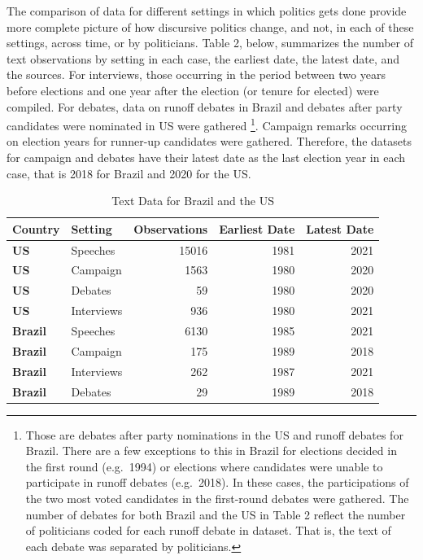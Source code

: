 \documentclass[smallextended]{svjour3}       %
\begin{document}
The comparison of data for different settings in which politics gets
done provide more complete picture of how discursive politics change,
and not, in each of these settings, across time, or by politicians.
Table 2, below, summarizes the number of text observations by setting in
each case, the earliest date, the latest date, and the sources. For
interviews, those occurring in the period between two years before
elections and one year after the election (or tenure for elected) were
compiled. For debates, data on runoff debates in Brazil and debates
after party candidates were nominated in US were gathered \footnote{
  Those are debates after party nominations in the US and runoff debates
  for Brazil. There are a few exceptions to this in Brazil for elections
  decided in the first round (e.g.~1994) or elections where candidates
  were unable to participate in runoff debates (e.g.~2018). In these
  cases, the participations of the two most voted candidates in the
  first-round debates were gathered. The number of debates for both
  Brazil and the US in Table 2 reflect the number of politicians coded
  for each runoff debate in dataset. That is, the text of each debate
  was separated by politicians.}. Campaign remarks occurring on election
years for runner-up candidates were gathered. Therefore, the datasets
for campaign and debates have their latest date as the last election
year in each case, that is 2018 for Brazil and 2020 for the US.

\begin{table}[H]

\caption{\label{tab:table 2}Text Data for Brazil and the US}
\centering
\begin{tabular}[t]{>{}llrrr}
\toprule
Country & Setting & Observations & Earliest Date & Latest Date\\
\midrule
\textbf{US} & Speeches & 15016 & 1981 & 2021\\
\textbf{US} & Campaign & 1563 & 1980 & 2020\\
\textbf{US} & Debates & 59 & 1980 & 2020\\
\textbf{US} & Interviews & 936 & 1980 & 2021\\
\textbf{Brazil} & Speeches & 6130 & 1985 & 2021\\
\addlinespace
\textbf{Brazil} & Campaign & 175 & 1989 & 2018\\
\textbf{Brazil} & Interviews & 262 & 1987 & 2021\\
\textbf{Brazil} & Debates & 29 & 1989 & 2018\\
\bottomrule
\end{tabular}
\end{table}
\end{document}
